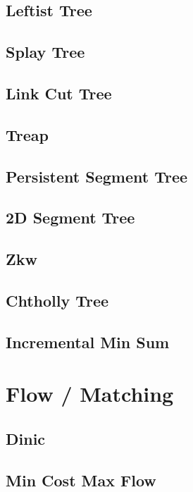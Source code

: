 \subsection{Leftist Tree}

\subsection{Splay Tree}

\subsection{Link Cut Tree}

\subsection{Treap}

\subsection{Persistent Segment Tree}

\subsection{2D Segment Tree}

\subsection{Zkw}

\subsection{Chtholly Tree}

\subsection{Incremental Min Sum}


\section{Flow / Matching}
\subsection{Dinic}

\subsection{Min Cost Max Flow}

